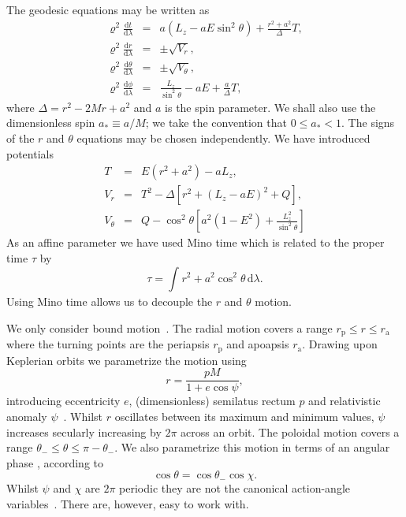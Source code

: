 \documentclass[aps,prd,amsfonts,amssymb,amsmath,nofootinbib,reprint,showpacs]{revtex4-1}
\newcommand{\sub}[1]{\ensuremath{_\text{#1}}}
\newcommand{\dd}{\ensuremath{\text{d}}}
\newcommand{\diff}[2]{\ensuremath{\frac{\dd {#1}}{\dd {#2}}}}
\newcommand{\intd}[4]{\ensuremath{\int_{#1}^{#2}{#3}\,\dd{#4}}}
\begin{document}
The geodesic equations may be written as~\cite{Carter1968, Chandrasekhar1992} %
\begin{subequations}
\begin{eqnarray}
\varrho^2 \diff{t}{\lambda} & = & a\left(L_z - aE\sin^2 \theta\right) + \frac{r^2 + a^2}{\Delta}T,\\
\varrho^2 \diff{r}{\lambda} & = & \pm \sqrt{V_r},\\
\varrho^2 \diff{\theta}{\lambda} & = & \pm \sqrt{V_\theta},\\
\varrho^2 \diff{\phi}{\lambda}&  = & \frac{L_z}{\sin^2 \theta} - aE + \frac{a}{\Delta}T,
\end{eqnarray}
\end{subequations}
where $\Delta = r^2 - 2M r + a^2$ and $a$ is the spin parameter. We shall also use the dimensionless spin $a_\ast \equiv a/M$; we take the convention that $0 \leq a_\ast < 1$. The signs of the $r$ and $\theta$ equations may be chosen independently. We have introduced potentials
\begin{subequations}
\begin{eqnarray}
T & = & E\left(r^2 +a^2\right) - aL_z,\\
V_r & = & T^2 - \Delta\left[r^2 + \left(L_z -aE\right)^2 + Q\right],\\
V_\theta & = & Q - \cos^2 \theta\left[a^2\left(1 - E^2\right) + {\displaystyle \frac{L_z^2}{\sin^2\theta}}\right]
\end{eqnarray}
\end{subequations}
As an affine parameter we have used Mino time which is related to the proper time $\tau$ by~\cite{Mino2003}
\begin{equation}
\tau = \intd{}{}{r^2 + a^2 \cos^2\theta}{\lambda}.
\end{equation}
Using Mino time allows us to decouple the $r$ and $\theta$ motion.

We only consider bound motion~\citep{Wilkins1972}. The radial motion covers a range $r\sub{p} \leq r \leq r\sub{a}$ where the turning points are the periapsis $r\sub{p}$ and apoapsis $r\sub{a}$. Drawing upon Keplerian orbits we parametrize the motion using
\begin{equation}
r = \frac{p M}{1+e\cos\psi},
\end{equation}
introducing eccentricity $e$, (dimensionless) semilatus rectum $p$ and relativistic anomaly $\psi$~\cite{Darwin1961,Drasco2004}. Whilst $r$ oscillates between its maximum and minimum values, $\psi$ increases secularly increasing by $2\pi$ across an orbit. The poloidal motion covers a range $\theta_- \leq \theta \leq \pi - \theta_-$. We also parametrize this motion in terms of an angular phase \chi, according to~\cite{Drasco2004}
\begin{equation}
\cos\theta = \cos\theta_-\cos\chi.
\end{equation}
Whilst $\psi$ and $\chi$ are $2\pi$ periodic they are not the canonical action-angle variables~\cite{Schmidt2002}. There are, however, easy to work with.
\end{document}
